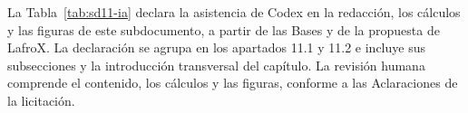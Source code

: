 
La Tabla~\ref{tab:sd11-ia} declara la asistencia de Codex en la redacción, los cálculos y las figuras de este subdocumento, a partir de las Bases y de la propuesta de LafroX. La declaración se agrupa en los apartados 11.1 y 11.2 e incluye sus subsecciones y la introducción transversal del capítulo. La revisión humana comprende el contenido, los cálculos y las figuras, conforme a las Aclaraciones de la licitación.

